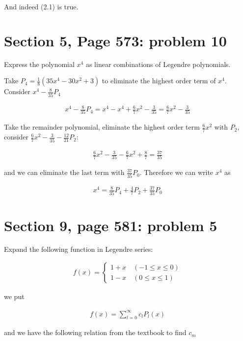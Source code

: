 \documentclass{article}
\numberwithin{equation}{section}
\begin{document}
And indeed (2.1) is true.

\section{Section 5, Page 573: problem 10}

Express the polynomial $x^4$ as linear combinations of Legendre polynomials.

Take $P_4 = \frac{1}{8} (35 x^4 - 30x^2 + 3)$ to eliminate the highest order term of $x^4$. Consider $x^4 - \frac{8}{35} P_4$

\begin{align}
    x^4 - \frac{8}{35} P_4 =x^4 - x^4 + \frac{6}{7} x^2 - \frac{3}{35} = \frac{6}{7} x^2 - \frac{3}{35}
\end{align}

Take the remainder polynomial, eliminate the highest order term $\frac{6}{7} x^2$ with $P_2$, consider $\frac{6}{7} x^2 - \frac{3}{35} - \frac{12}{21}P_2$:

\begin{align}
    \frac{6}{7}x^2 - \frac{3}{35} - \frac{6}{7} x^2 + \frac{8}{7} = \frac{37}{35}
\end{align}

and we can eliminate the last term with $\frac{37}{35}P_0$. Therefore we can write $x^4$ as

\begin{align}
    x^4 = \frac{8}{35} P_4 + \frac{4}{7} P_2 + \frac{37}{35} P_0
\end{align}


\section{Section 9, page 581: problem 5}

Expand the following function in Legendre series:

\begin{align}
    f(x) = \begin{cases}
        1 + x   \quad    ( -1 \leq x \leq 0) \\
        1 - x   \quad    (0 \leq x \leq 1)
    \end{cases}
\end{align}

we put 

\begin{align}
    f(x)  = \sum_{l=0}^{\infty} c_l P_l(x)
\end{align}

and we have the following relation from the textbook to find $c_m$
\end{document}
